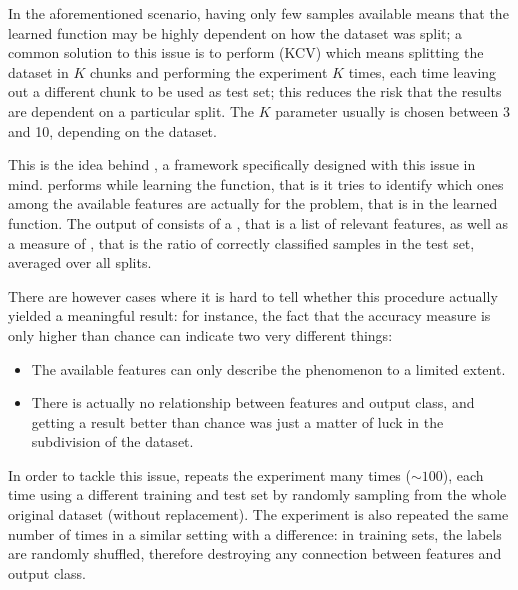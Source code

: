 \documentclass[letterpaper,10pt,english]{sphinxmanual}
\begin{document}
In the aforementioned scenario, having only few samples available means that the learned function may be highly dependent on how the dataset was split; a common solution to this issue is to perform  (KCV) which means splitting the dataset in \(K\) chunks and performing the experiment \(K\) times, each time leaving out a different chunk to be used as test set; this reduces the risk that the results are dependent on a particular split. The \(K\) parameter usually is chosen between 3 and 10, depending on the dataset.

This is the idea behind  , a framework specifically designed with this issue in mind.
 performs  while learning the function, that is it tries to identify which ones among the available features are actually  for the problem, that is  in the learned function.
The output of  consists of a , that is a list of relevant features, as well as a measure of , that is the ratio of correctly classified samples in the test set, averaged over all splits.

There are however cases where it is hard to tell whether this procedure actually yielded a meaningful result: for instance, the fact that the accuracy measure is only  higher than chance can indicate two very different things:
\begin{itemize}
\item {} 
The available features can only describe the phenomenon to a limited extent.

\item {} 
There is actually no relationship between features and output class, and getting a result better than chance was just a matter of luck in the subdivision of the dataset.

\end{itemize}

In order to tackle this issue,  repeats the experiment many times (\(\sim 100\)), each time using a different training and test set by randomly sampling from the whole original dataset (without replacement).
The experiment is also repeated the same number of times in a similar setting with a difference: in training sets, the labels are randomly shuffled, therefore destroying any connection between features and output class.
\end{document}
